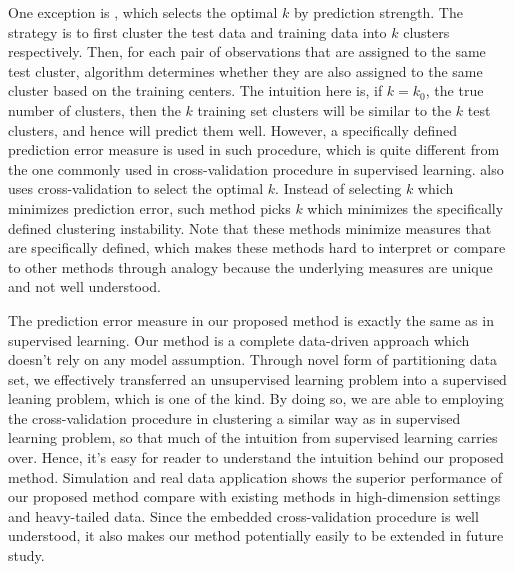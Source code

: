 \documentclass[12pt]{article}
\begin{document}
One exception is \cite{tibshirani2005cluster}, which selects the optimal $k$ by prediction
strength. The strategy is to first cluster the test data and training data
into $k$ clusters respectively. Then, for each pair of observations that are
assigned to the same test cluster, algorithm determines whether they are also
assigned to the same cluster based on the training centers. The intuition here
is, if $k=k_0$, the true number of clusters, then the $k$ training set
clusters will be similar to the $k$ test clusters, and hence will predict them
well. However, a specifically defined prediction error measure is used in such
procedure, which is quite different from the one commonly used in
cross-validation procedure in supervised learning. \citet{wang2010consistent} also uses 
cross-validation to select the optimal $k$. Instead of selecting $k$ which minimizes 
prediction error, such method picks $k$ which minimizes the specifically defined 
clustering instability. Note that these methods minimize measures that are specifically defined,
which makes these methods hard to interpret or compare to other methods through analogy because
the underlying measures are unique and not well understood. 
 
The prediction error measure in our proposed method is exactly the same as in supervised learning.
Our method is a complete data-driven approach which doesn't rely on
any model assumption. Through novel form of partitioning data set, we effectively 
transferred an unsupervised learning problem into a supervised leaning problem, which is one of
the kind. By doing so, we are able to employing the cross-validation procedure in clustering 
a similar way as in supervised learning problem, so that much of the intuition from supervised learning
carries over. Hence, it's easy for reader to
understand the intuition behind our proposed method. Simulation and real data
application shows the superior performance of our proposed method compare with
existing methods in high-dimension settings and heavy-tailed data. Since the
embedded cross-validation procedure is well understood, it also makes our
method potentially easily to be extended in future study. 
\end{document}
